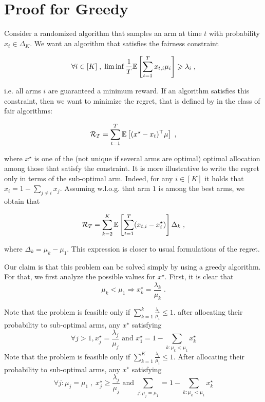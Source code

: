 \section{Proof for Greedy}

Consider a randomized algorithm that samples an arm at time $t$ with probability $x_t \in \Delta_K$. We want an algorithm that satisfies the fairness constraint

\[\forall i \in [K]\;, \; \liminf \frac{1}{T} \mathbb{E}\left[\sum_{t=1}^T x_{t,i} \mu_i \right] \geqslant \lambda_i \;,\]

i.e. all arms $i$ are guaranteed a minimum reward. If an algorithm satisfies this constraint, then we want to minimize the regret, that is defined by in the class of fair algorithms:

\[ \mathcal{R}_T = \sum_{t=1}^T \mathbb{E}\left[(x^\star - x_t)^\top\mu \right]\;, \]

where $x^\star$ is one of the (not unique if several arms are optimal) optimal allocation among those that satisfy the constraint. It is more illustrative to write the regret only in terms of the sub-optimal arm. Indeed, for any $i\in [K]$ it holds that $x_i = 1-\sum_{j \neq i } x_j$. Assuming w.l.o.g. that arm $1$ is among the best arms, we obtain that 

\begin{equation}\label{eq::regret}\mathcal{R}_T =  \sum_{k=2}^K \mathbb{E}\left[\sum_{t=1}^T (x_{t, i} - x^\star_i)\right] \Delta_k \;, \end{equation}

where $\Delta_k = \mu_k - \mu_1$. This expression is closer to usual formulations of the regret.

Our claim is that this problem can be solved simply by using a greedy algorithm. For that, we first analyze the possible values for $x^\star$. First, it is clear that \[ \mu_k < \mu_1 \Rightarrow x_k^\star = \frac{\lambda_k}{\mu_k} \;. \]

Note that the problem is feasible only if $\sum_{k=1}^{k}\frac{\lambda_i}{\mu_i} \leq  1$. after allocating their probability to sub-optimal arms, any $x^\star$ satisfying \[  \forall j > 1,   x_j^\star = \frac{\lambda_j}{\mu_j} \text{ and } x_1^{\star}  = 1 -\sum_{k: \mu_k<\mu_1} x_k^\star \]
Note that the problem is feasible only if $\sum_{k=1}^{K}\frac{\lambda_i}{\mu_i}\leq1$. After allocating their probability to sub-optimal arms, any $x^\star$ satisfying \[ \forall j: \mu_j =\mu_1\;, \; x_j^\star \geq \frac{\lambda_j}{\mu_j} \text{ and } \sum_{j: \mu_j=\mu_1} = 1 -\sum_{k: \mu_k<\mu_1} x_k^\star \]

